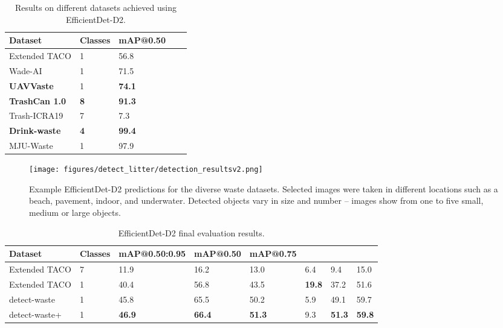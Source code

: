 \documentclass{article}
\begin{document}
{
\begin{table}[!hbt]
\centering
\caption{Results on different datasets achieved using EfficientDet-D2.}
\label{tab:datacomp}
\begin{tabular}{lllll}
\hline
\textbf{Dataset}       & \textbf{Classes} & \textbf{mAP@0.50} \\ \hline
Extended TACO          & 1                & 56.8  \\
Wade-AI                & 1                & 71.5  \\
\textbf{UAVVaste}      & 1                & \textbf{74.1}  \\ \hline
\textbf{TrashCan 1.0}  & \textbf{8}       & \textbf{91.3}  \\
Trash-ICRA19           & 7                & 7.3  \\ \hline
\textbf{Drink-waste}   & \textbf{4}       & \textbf{99.4}  \\
MJU-Waste              & 1                & 97.9  \\
\hline
\end{tabular}
\end{table}
}

\begin{figure}[!hbt]
\centering
  \texttt{[image: figures/detect\_litter/detection\_resultsv2.png]}\caption{Example EfficientDet-D2 predictions for the diverse waste datasets. Selected images were taken in different locations such as a beach, pavement, indoor, and underwater. Detected objects vary in size and number -- images show from one to five small, medium or large objects.\label{fig.detection_results}}
\end{figure}

{
\begin{table}[!hbt]
\centering
\caption{EfficientDet-D2 final evaluation results.}
\label{tab:finalresults}
\begin{tabular}{llllllll}
\hline
\textbf{Dataset}       & \textbf{Classes} & \textbf{mAP@0.50:0.95} & \textbf{mAP@0.50} & \textbf{mAP@0.75} &  &  & \\ \hline
Extended TACO      & 7       & 11.9          & 16.2           & 13.0          & 6.4           & 9.4            & 15.0 \\
Extended TACO      & 1       & 40.4          & 56.8           & 43.5          & \textbf{19.8} & 37.2           & 51.6  \\
detect-waste       & 1       & 45.8          & 65.5           & 50.2          & 5.9           & 49.1           & 59.7  \\
detect-waste+      & 1       & \textbf{46.9} & \textbf{66.4}  & \textbf{51.3} & 9.3           & \textbf{51.3}  & \textbf{59.8}  \\
\hline
\end{tabular}
\end{table}
}
\end{document}
